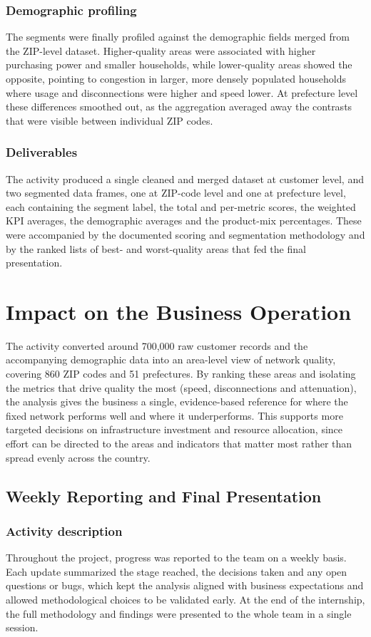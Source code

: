 \documentclass[12pt, a4paper, oneside]{report}
\begin{document}
\subsubsection{Demographic profiling} 
The segments were finally profiled against the demographic fields merged from the ZIP-level dataset. Higher-quality areas were associated with higher purchasing power and smaller households, while lower-quality areas showed the opposite, pointing to congestion in larger, more densely populated households where usage and disconnections were higher and speed lower. At prefecture level these differences smoothed out, as the aggregation averaged away the contrasts that were visible between individual ZIP codes.


\subsubsection{Deliverables}
The activity produced a single cleaned and merged dataset at customer level, and two segmented data frames, one at ZIP-code level and one at prefecture level, each containing the segment label, the total and per-metric scores, the weighted KPI averages, the demographic averages and the product-mix percentages. These were accompanied by the documented scoring and segmentation methodology and by the ranked lists of best- and worst-quality areas that fed the final presentation.


\section{Impact on the Business Operation}
The activity converted around 700,000 raw customer records and the accompanying demographic data into an area-level view of network quality, covering 860 ZIP codes and 51 prefectures. By ranking these areas and isolating the metrics that drive quality the most (speed, disconnections and attenuation), the analysis gives the business a single, evidence-based reference for where the fixed network performs well and where it underperforms. This supports more targeted decisions on infrastructure investment and resource allocation, since effort can be directed to the areas and indicators that matter most rather than spread evenly across the country.

\subsection{Weekly Reporting and Final Presentation}
\subsubsection{Activity description}
Throughout the project, progress was reported to the team on a weekly basis. Each update summarized the stage reached, the decisions taken and any open questions or bugs, which kept the analysis aligned with business expectations and allowed methodological choices to be validated early. At the end of the internship, the full methodology and findings were presented to the whole team in a single session.
\end{document}
